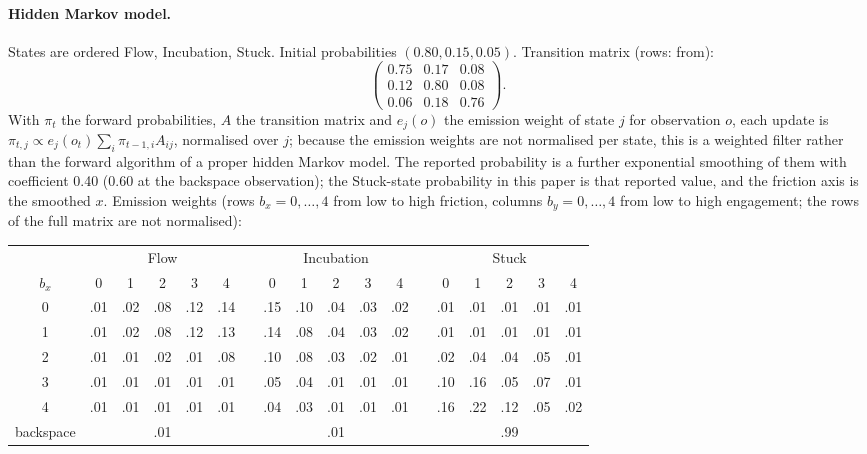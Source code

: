\paragraph{Hidden Markov model.} States are ordered Flow, Incubation, Stuck. Initial probabilities $(0.80, 0.15, 0.05)$.
Transition matrix (rows: from):
\[
\begin{pmatrix} 0.75 & 0.17 & 0.08 \\ 0.12 & 0.80 & 0.08 \\ 0.06 & 0.18 & 0.76 \end{pmatrix}.
\]
With $\pi_t$ the forward probabilities, $A$ the transition matrix and $e_j(o)$ the emission weight of state $j$ for
observation $o$, each update is $\pi_{t,j} \propto e_j(o_t) \sum_i \pi_{t-1,i} A_{ij}$, normalised over $j$; because
the emission weights are not normalised per state, this is a weighted filter rather than the forward algorithm of a
proper hidden Markov model. The reported probability is a further exponential smoothing of
them with coefficient 0.40 (0.60 at the backspace observation); the Stuck-state probability in this paper is that
reported value, and the friction axis is the smoothed $x$. Emission weights (rows $b_x = 0, \ldots, 4$ from low to high
friction, columns $b_y = 0, \ldots, 4$ from low to high engagement; the rows of the full matrix are not normalised):

\begin{center}\footnotesize
\setlength{\tabcolsep}{3pt}
\begin{tabular}{c ccccc c ccccc c ccccc}
  \toprule
  & \multicolumn{5}{c}{Flow} && \multicolumn{5}{c}{Incubation} && \multicolumn{5}{c}{Stuck} \\
  $b_x$ & 0 & 1 & 2 & 3 & 4 && 0 & 1 & 2 & 3 & 4 && 0 & 1 & 2 & 3 & 4 \\
  \midrule
  0 & .01 & .02 & .08 & .12 & .14 && .15 & .10 & .04 & .03 & .02 && .01 & .01 & .01 & .01 & .01 \\
  1 & .01 & .02 & .08 & .12 & .13 && .14 & .08 & .04 & .03 & .02 && .01 & .01 & .01 & .01 & .01 \\
  2 & .01 & .01 & .02 & .01 & .08 && .10 & .08 & .03 & .02 & .01 && .02 & .04 & .04 & .05 & .01 \\
  3 & .01 & .01 & .01 & .01 & .01 && .05 & .04 & .01 & .01 & .01 && .10 & .16 & .05 & .07 & .01 \\
  4 & .01 & .01 & .01 & .01 & .01 && .04 & .03 & .01 & .01 & .01 && .16 & .22 & .12 & .05 & .02 \\
  \midrule
  backspace & \multicolumn{5}{c}{.01} && \multicolumn{5}{c}{.01} && \multicolumn{5}{c}{.99} \\
  \bottomrule
\end{tabular}
\end{center}

